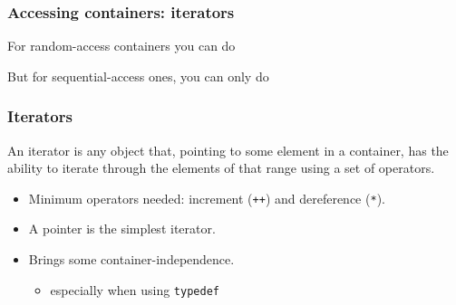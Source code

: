 \subsubsection{Accessing containers:
iterators}\label{accessing-containers-iterators}

For random-access containers you can do

\begin{Shaded}
\begin{Highlighting}[]

\NormalTok{,}\NormalTok{,}\NormalTok{,}\NormalTok{\};}
 \NormalTok{(} 
\NormalTok{\}}
\end{Highlighting}
\end{Shaded}

But for sequential-access ones, you can only do

\begin{Shaded}
\begin{Highlighting}[]


\NormalTok{,}\NormalTok{,}\NormalTok{,}\NormalTok{\};}
 
\NormalTok{\}}
\end{Highlighting}
\end{Shaded}

\subsubsection{Iterators}\label{iterators-1}

An iterator is any object that, pointing to some element in a container,
has the ability to iterate through the elements of that range using a
set of operators.

\begin{itemize}
\itemsep1pt\parskip0pt
\item
  Minimum operators needed: increment (\texttt{++}) and dereference
  (\texttt{*}).
\item
  A pointer is the simplest iterator.
\item
  Brings some container-independence.

  \begin{itemize}
  \itemsep1pt\parskip0pt
  \item
    especially when using \texttt{typedef}
  \end{itemize}
\end{itemize}

